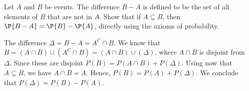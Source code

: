 
\setcounter{theorem}{21}

\begin{exercise}[BH.1.44]
	Let $A$ and $B$ be events. The difference $B - A$ is defined to be the set of all elements of $B$ that are not in $A$. Show that if $A \subseteq B$, then $\P{B - A} = \P{B} - \P{A}$, directly using the axioms of probability.
\begin{solution}
	The difference $\Delta = B-A=A^{C}\cap B$. We know that $B = (A\cap B)\cup ( A^{C}\cap B) = (A\cap B)\cup (\Delta)$, where $A\cap B$ is disjoint from $\Delta$. Since these are disjoint $P(B) = P(A\cap B) + P(\Delta)$. Using now that $A\subseteq B$, we have $A\cap B = A$. Hence, $P(B) = P(A) + P(\Delta)$. We conclude that $P(\Delta) = P(B)-P(A)$.
\end{solution}
\end{exercise}


